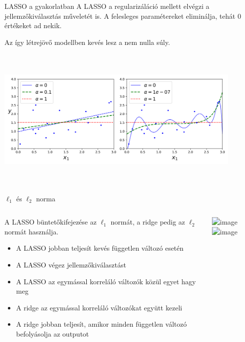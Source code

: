 \documentclass[english, aspectratio=169]{beamer}
\begin{document}
\begin{frame}{LASSO a gyakorlatban}
A LASSO a regularizáláció mellett elvégzi a jellemzőkiválasztás műveletét is. A felesleges paramétereket eliminálja, tehát $0$ értékeket ad nekik.\par\medskip
Az így létrejövő modellben kevés lesz a nem nulla súly. 
\begin{center}
\includegraphics[width=12cm, height=7cm, keepaspectratio]{images/regularization_12.png}
\end{center}
\end{frame}

\begin{frame}{$\ell_1$ és $\ell_2$ norma}
\begin{columns}
\begin{column}{.5\textwidth}
A LASSO büntetőkifejezése az $\ell_1$ normát, a ridge pedig az $\ell_2$ normát használja. 
\begin{itemize}
	\item A LASSO jobban teljesít kevés független változó esetén
	\item A LASSO végez jellemzőkiválasztást
	\item A LASSO az egymással korreláló változók közül egyet hagy meg
	\item A ridge az egymással korreláló változókat együtt kezeli
	\item A ridge jobban teljesít, amikor minden független változó befolyásolja az outputot
\end{itemize}
\end{column}
\begin{column}{.5\textwidth}
\begin{center}
\includegraphics<1>[width=7cm, height=6cm, keepaspectratio]{images/regularization_13.png}
\includegraphics<2>[width=7cm, height=6cm, keepaspectratio]{images/regularization_14.png}
\end{center}
\end{column}
\end{columns}
\end{frame}
\end{document}
